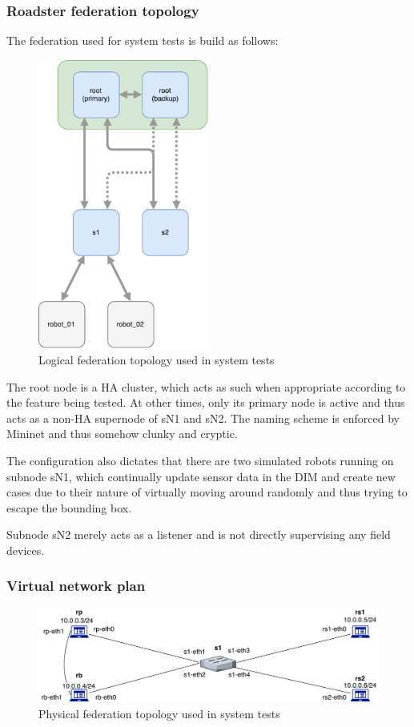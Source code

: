\subsubsection{Roadster federation topology}
The federation used for system tests is build as follows:
\begin{figure}[]
	\center
	\includegraphics[width=0.5\textwidth]{img/logical_federation_setup.pdf}
	\caption{Logical federation topology used in system tests}
	\label{lst:testing:topo:logic}
\end{figure}

The root node is a HA cluster, which acts as such when appropriate according to
the feature being tested. At other times, only its primary node is active and
thus acts as a non-HA supernode of sN1 and sN2. The naming scheme is enforced
by Mininet and thus somehow clunky and cryptic.

The configuration also dictates that there are two simulated robots running on
subnode sN1, which continually update sensor data in the DIM and create new
cases due to their nature of virtually moving around randomly and thus trying
to escape the bounding box.

Subnode sN2 merely acts as a listener and is not directly supervising any field
devices.

\subsubsection{Virtual network plan}
\begin{figure}[]
	\center
	\includegraphics[width=\textwidth]{img/physical_network_mininet.pdf}
	\caption{Physical federation topology used in system tests}
	\label{lst:testing:topo:logic}
\end{figure}

